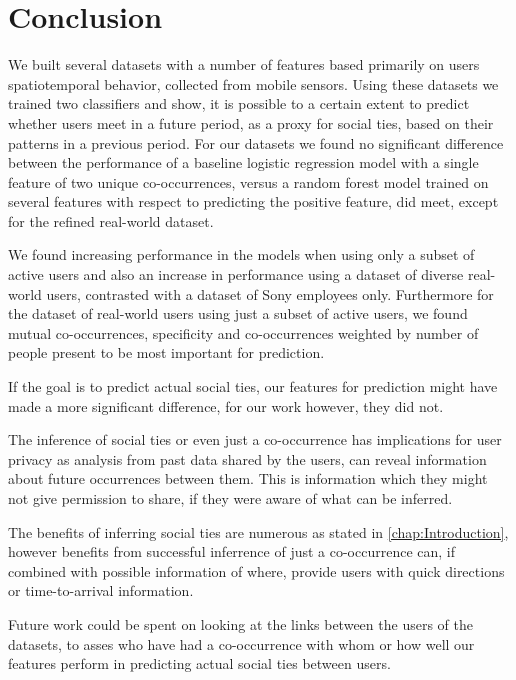 \chapter{Conclusion}
\label{chap:conclusion}
We built several datasets with a number of features based primarily on users spatiotemporal behavior, collected from mobile sensors. Using these datasets we trained two classifiers and show, it is possible to a certain extent to predict whether users meet in a future period, as a proxy for social ties, based on their patterns in a previous period. For our datasets we found no significant difference between the performance of a baseline logistic regression model with a single feature of two unique co-occurrences, versus a random forest model trained on several features with respect to predicting the positive feature, did meet, except for the refined real-world dataset.

We found increasing performance in the models when using only a subset of active users and also an increase in performance using a dataset of diverse real-world users, contrasted with a dataset of Sony employees only. Furthermore for the dataset of real-world users using just a subset of active users, we found mutual co-occurrences, specificity and co-occurrences weighted by number of people present to be most important for prediction.

If the goal is to predict actual social ties, our features for prediction might have made a more significant difference, for our work however, they did not.

The inference of social ties or even just a co-occurrence has implications for user privacy as analysis from past data shared by the users, can reveal information about future occurrences between them. This is information which they might not give permission to share, if they were aware of what can be inferred.

The benefits of inferring social ties are numerous as stated in \autoref{chap:Introduction}, however benefits from successful inferrence of just a co-occurrence can, if combined with possible information of where, provide users with quick directions or time-to-arrival information.

Future work could be spent on looking at the links between the users of the datasets, to asses who have had a co-occurrence with whom or how well our features perform in predicting actual social ties between users.